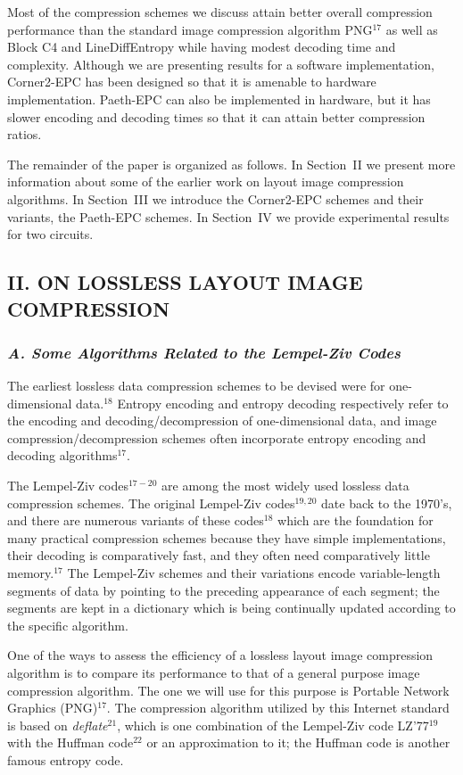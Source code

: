 \documentclass{article}
\begin{document}
Most of the compression schemes we discuss attain better
overall compression performance than the standard image compression algorithm
PNG$^{17}$ as well as  Block C4 and LineDiffEntropy while having modest
decoding time and complexity.  Although we are presenting 
results for a software implementation, Corner2-EPC has been designed so that 
it is amenable to hardware implementation.  Paeth-EPC can also be implemented
in hardware, but it has slower encoding and decoding times so that it can
attain better compression ratios.

The remainder of the paper is organized as follows.  In Section~II we present
more information about some of the earlier work on layout image compression
algorithms.  In Section~III we introduce the Corner2-EPC schemes and their
variants, the Paeth-EPC schemes.
In Section~IV we provide experimental results for two circuits.

\subsection*{II. ON LOSSLESS LAYOUT IMAGE COMPRESSION}
\subsubsection*{{\em A. Some Algorithms Related to the Lempel-Ziv Codes}}
The earliest lossless data compression schemes to be devised were for
one-dimensional data.$^{18}$
Entropy encoding and entropy decoding respectively refer to the encoding 
and decoding/decompression of one-dimensional data, and
image compression/decompression schemes often incorporate
entropy encoding and decoding algorithms$^{17}$.  

The Lempel-Ziv codes$^{17-20}$ are among the most widely used lossless data
compression schemes. 
The original Lempel-Ziv codes$^{19,20}$ date back to the 1970's, and there 
are numerous variants of these codes$^{18}$ which are the foundation
for many practical compression schemes because they have simple 
implementations, their decoding is comparatively fast, and they often need 
comparatively little memory.$^{17}$  
The Lempel-Ziv schemes and their variations encode
variable-length segments of data by pointing to the preceding appearance of
each segment; the segments are kept in a dictionary which is being continually
updated according to the specific algorithm.  

One of the ways to assess the efficiency of a lossless layout image
compression algorithm is to compare its performance to that of a general
purpose image compression algorithm.  The one we will use for this purpose
is Portable Network Graphics (PNG)$^{17}$.  The compression algorithm
utilized by this Internet standard is based on {\it deflate}$^{21}$,
which is one combination of the Lempel-Ziv code LZ'77$^{19}$ with the
Huffman code$^{22}$ or an approximation to it; the Huffman code is another 
famous entropy code.
\end{document}
